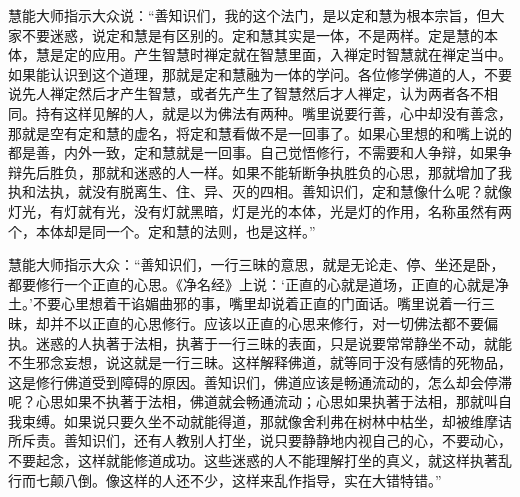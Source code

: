 \documentclass[12pt,twoside,openany]{book}
\newcommand{\kai}[1]{{\CJKfamily{kai}#1}}
\begin{document}
\kai{慧能大师指示大众说：“善知识们，我的这个法门，是以定和慧为根本宗旨，但大家不要迷惑，说定和慧是有区别的。定和慧其实是一体，不是两样。定是慧的本体，慧是定的应用。产生智慧时禅定就在智慧里面，入禅定时智慧就在禅定当中。如果能认识到这个道理，那就是定和慧融为一体的学问。各位修学佛道的人，不要说先人禅定然后才产生智慧，或者先产生了智慧然后才人禅定，认为两者各不相同。持有这样见解的人，就是以为佛法有两种。嘴里说要行善，心中却没有善念，那就是空有定和慧的虚名，将定和慧看做不是一回事了。如果心里想的和嘴上说的都是善，内外一致，定和慧就是一回事。自己觉悟修行，不需要和人争辩，如果争辩先后胜负，那就和迷惑的人一样。如果不能斩断争执胜负的心思，那就增加了我执和法执，就没有脱离生、住、异、灭的四相。善知识们，定和慧像什么呢？就像灯光，有灯就有光，没有灯就黑暗，灯是光的本体，光是灯的作用，名称虽然有两个，本体却是同一个。定和慧的法则，也是这样。”
	
慧能大师指示大众：“善知识们，一行三昧的意思，就是无论走、停、坐还是卧，都要修行一个正直的心思。《净名经》上说：‘正直的心就是道场，正直的心就是净土。’不要心里想着干谄媚曲邪的事，嘴里却说着正直的门面话。嘴里说着一行三昧，却并不以正直的心思修行。应该以正直的心思来修行，对一切佛法都不要偏执。迷惑的人执著于法相，执著于一行三昧的表面，只是说要常常静坐不动，就能不生邪念妄想，说这就是一行三昧。这样解释佛道，就等同于没有感情的死物品，这是修行佛道受到障碍的原因。善知识们，佛道应该是畅通流动的，怎么却会停滞呢？心思如果不执著于法相，佛道就会畅通流动；心思如果执著于法相，那就叫自我束缚。如果说只要久坐不动就能得道，那就像舍利弗在树林中枯坐，却被维摩诘所斥责。善知识们，还有人教别人打坐，说只要静静地内视自己的心，不要动心，不要起念，这样就能修道成功。这些迷惑的人不能理解打坐的真义，就这样执著乱行而七颠八倒。像这样的人还不少，这样来乱作指导，实在大错特错。”

}
\end{document}
